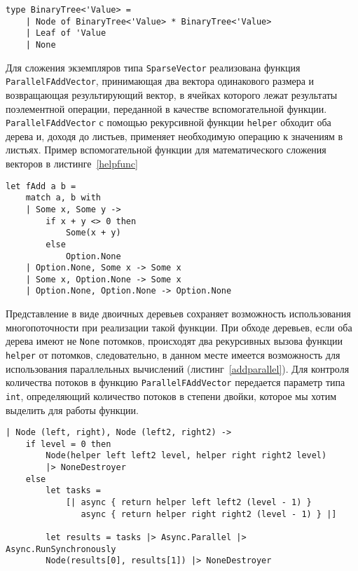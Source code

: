 \begin{lstlisting}[style=codelistingstyle, caption={Тип BinaryTree},label={binarytree}, frame=single]
type BinaryTree<'Value> =
    | Node of BinaryTree<'Value> * BinaryTree<'Value>
    | Leaf of 'Value
    | None
\end{lstlisting}

Для сложения экземпляров типа \texttt{SparseVector} реализована функция \texttt{ParallelFAddVector}, принимающая два вектора одинакового размера и возвращающая результирующий вектор, в ячейках которого лежат результаты поэлементной операции, переданной в качестве вспомогательной функции. \texttt{ParallelFAddVector} с помощью рекурсивной функции \texttt{helper} обходит оба дерева и, доходя до листьев, применяет необходимую операцию к значениям в листьях. Пример вспомогательной функции для математического сложения векторов в листинге~\ref{helpfunc} 

\begin{lstlisting}[style=codelistingstyle, caption={Пример вспомогательной поэлементной функции},label={helpfunc}, frame=single]
let fAdd a b =
    match a, b with
    | Some x, Some y ->
        if x + y <> 0 then
            Some(x + y)
        else
            Option.None
    | Option.None, Some x -> Some x
    | Some x, Option.None -> Some x
    | Option.None, Option.None -> Option.None
\end{lstlisting}

Представление в виде двоичных деревьев сохраняет возможность использования многопоточности при реализации такой функции. При обходе деревьев, если оба дерева имеют не \texttt{None} потомков, происходят два рекурсивных вызова функции \texttt{helper} от потомков, следовательно, в данном месте имеется возможность для использования параллельных вычислений (листинг~\ref{addparallel}). Для контроля количества потоков в функцию \texttt{ParallelFAddVector} передается параметр типа \texttt{int}, определяющий количество потоков в степени двойки, которое мы хотим выделить для работы функции.

\begin{lstlisting}[style=codelistingstyle, caption={Разделение задачи сложения двух деревьев на две подзадачи и использование потоков для получения результата},label={addparallel}, frame=single]
| Node (left, right), Node (left2, right2) ->
    if level = 0 then
        Node(helper left left2 level, helper right right2 level)
        |> NoneDestroyer
    else
        let tasks =
            [| async { return helper left left2 (level - 1) }
               async { return helper right right2 (level - 1) } |]

        let results = tasks |> Async.Parallel |> Async.RunSynchronously
        Node(results[0], results[1]) |> NoneDestroyer
\end{lstlisting}


